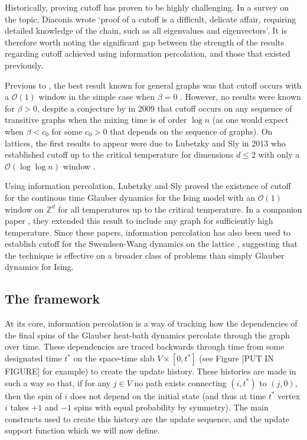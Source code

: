 	Historically, proving cutoff has proven to be highly challenging. In a survey on the topic, Diaconis \cite{Diaconis1996-sz} wrote `proof of a cutoff is a difficult, delicate affair, requiring detailed knowledge of the chain, such as all eigenvalues and eigenvectors'. It is therefore worth noting the significant gap between the strength of the results regarding cutoff achieved using information percolation, and those that existed previously.

	Previous to \cite{Lubetzky2016-wd}, the best result known for general graphs was that cutoff occurs with a $\mathcal{O}(1)$ window in the simple case when $\beta = 0$ \cite{Aldous1983-gz}. However, no results were known for $\beta > 0$, despite a conjecture by \citeauthor{Levin2009-fo} in 2009 \cite[Section 23.2]{Levin2009-fo} that cutoff occurs on any sequence of transitive graphs when the mixing time is of order $\log n$ (as one would expect when $\beta < c_0$ for some $c_0 > 0$ that depends on the sequence of graphs). On lattices, the first results to appear were due to Lubetzky and Sly in 2013 who established cutoff up to the critical temperature for dimensions $d \leq 2$ with only a $\mathcal{O}(\log \log n)$ window \cite{Lubetzky2013-yv}. 

	Using information percolation, Lubetzky and Sly proved the existence of cutoff for the continous time Glauber dynamics for the Ising model with an $\mathcal{O}(1)$ window on $\mathbb{Z}^d$ for all temperatures up to the critical temperature. In a companion paper \cite{Lubetzky2017-nc}, they extended this result to include any graph for sufficiently high temperature. Since these papers, information percolation has also been used to establish cutoff for the Swendsen-Wang dynamics on the lattice \cite{Nam2018-io}, suggesting that the technique is effective on a broader class of problems than simply Glauber dynamics for Ising.
	
	\subsection{The framework}
	At its core, information percolation is a way of tracking how the dependencies of the final spins of the Glauber heat-bath dynamics percolate through the graph over time. These dependencies are traced backwards through time from some designated time $t^*$ on the space-time slab $V \times [0, t^*]$ (see Figure [PUT IN FIGURE] for example) to create the update history. These histories are made in such a way so that, if for any $j \in V$ no path exists connecting $(i, t^*)$ to $(j, 0)$, then the spin of $i$ does not depend on the initial state (and thus at time $t^*$ vertex $i$ takes $+1$ and $-1$ spins with equal probability by symmetry). The main constructs used to create this history are the update sequence, and the update support function which we will now define.

